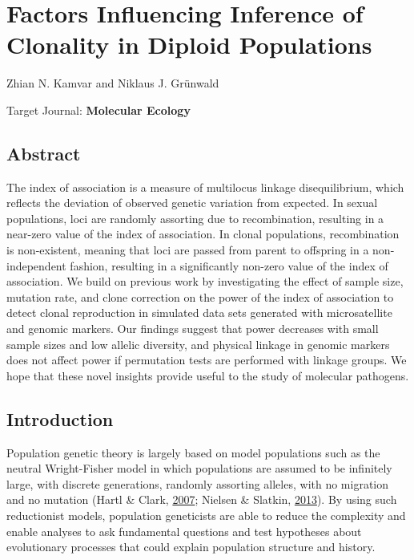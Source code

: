 \documentclass[double,11pt]{beavtex}
\begin{document}
  \chapter{Factors Influencing Inference of Clonality in Diploid
  Populations}\label{factors-influencing-inference-of-clonality-in-diploid-populations}
  
  \singlespacing
  
  \begin{center}
  
  
  Zhian N. Kamvar and Niklaus J. Grünwald
  
  
  
  \end{center}\vspace*{\fill}
  
  Target Journal: \textbf{Molecular Ecology}
  
  \doublespacing
  \newpage
  
  \section{Abstract}\label{abstract-3}
  
  The index of association is a measure of multilocus linkage
  disequilibrium, which reflects the deviation of observed genetic
  variation from expected. In sexual populations, loci are randomly
  assorting due to recombination, resulting in a near-zero value of the
  index of association. In clonal populations, recombination is
  non-existent, meaning that loci are passed from parent to offspring in a
  non-independent fashion, resulting in a significantly non-zero value of
  the index of association. We build on previous work by investigating the
  effect of sample size, mutation rate, and clone correction on the power
  of the index of association to detect clonal reproduction in simulated
  data sets generated with microsatellite and genomic markers. Our
  findings suggest that power decreases with small sample sizes and low
  allelic diversity, and physical linkage in genomic markers does not
  affect power if permutation tests are performed with linkage groups. We
  hope that these novel insights provide useful to the study of molecular
  pathogens.
  
  \section{Introduction}\label{introduction-4}
  
  Population genetic theory is largely based on model populations such as
  the neutral Wright-Fisher model in which populations are assumed to be
  infinitely large, with discrete generations, randomly assorting alleles,
  with no migration and no mutation (Hartl \& Clark,
  \protect\hyperlink{ref-hartl1997principles}{2007}; Nielsen \& Slatkin,
  \protect\hyperlink{ref-nielsen2013introduction}{2013}). By using such
  reductionist models, population geneticists are able to reduce the
  complexity and enable analyses to ask fundamental questions and test
  hypotheses about evolutionary processes that could explain population
  structure and history.
  
\end{document}
